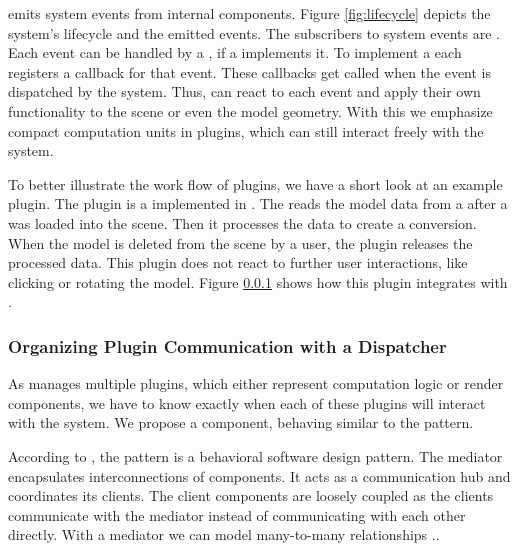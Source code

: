 \documentclass[../ClassicThesis.tex]{subfiles}
\begin{document}
{\convertify} emits system events from internal components.
Figure \ref{fig:lifecycle} depicts the system's lifecycle
and the emitted events. The subscribers to system events are
. Each event can be handled by a
, if a  implements it. To
implement a  each  registers
a callback for that event. These callbacks get called when
the event is dispatched by the system. Thus, 
can react to each event and apply their own functionality to
the scene or even the model geometry. With this we emphasize
compact computation units in plugins, which can still
interact freely with the system.

To better illustrate the work flow of plugins, we have a
short look at an example plugin. The 
plugin is a  implemented in {\platener}. The
 reads the model data from a 
after a {\threedmodel} was loaded into the scene. Then it
processes the data to create a {\lasercutter} conversion.
When the model is deleted from the scene by a user, the
plugin releases the processed data. This plugin does not
react to further user interactions, like clicking or
rotating the model. Figure \ref{}  shows how this plugin integrates with {\convertify}.

\subsubsection{Organizing Plugin Communication with a
  Dispatcher}


As {\convertify} manages multiple plugins, which either
represent computation logic or render components, we have to
know exactly when each of these plugins will interact with the
system. We propose a  component, behaving
similar to the  pattern.

According to \citeauthor{gof}, the  pattern is a
behavioral software design pattern. The mediator encapsulates
interconnections of components. It acts as a communication hub and
coordinates its clients. The client components are loosely coupled as
the clients communicate with the mediator instead of communicating
with each other directly. With a mediator we can model many-to-many
relationships \cite[p. ?]{gof}..
\end{document}
